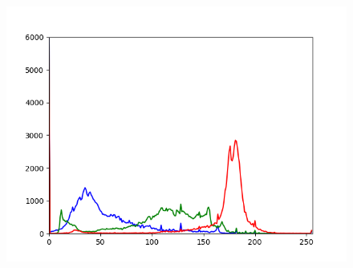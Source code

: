\documentclass[a4paper,12pt,oneside]{article}
\begin{document}
\begin{figure}[htb]
\begin{minipage}[c]{0.08\textwidth}
\end{minipage}
\hfill
\begin{minipage}[c]{0.3\textwidth}
\includegraphics[width=\textwidth]{Sources/Bild1_histo.png}
\end{minipage}
\end{figure}
\end{document}
